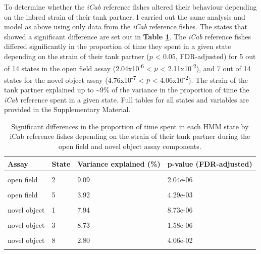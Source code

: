 \documentclass[
]{book}
\begin{document}
To determine whether the \emph{iCab} reference fishes altered their behaviour depending on the inbred strain of their tank partner, I carried out the same analysis and model as above using only data from the \emph{iCab} reference fishes. The states that showed a significant difference are set out in \textbf{Table \ref{tab:pilot-sge-tbl}}. The \emph{iCab} reference fishes differed significantly in the proportion of time they spent in a given state depending on the strain of their tank partner (\(p\) \textless{} 0.05, FDR-adjusted) for 5 out of 14 states in the open field assay (2.04x10\textsuperscript{-6} \textless{} \(p\) \textless{} 2.11x10\textsuperscript{-2}), and 7 out of 14 states for the novel object assay (4.76x10\textsuperscript{-7} \textless{} \(p\) \textless{} 4.06x10\textsuperscript{-2}). The strain of the tank partner explained up to \textasciitilde9\% of the variance in the proportion of time the \emph{iCab} reference spent in a given state. Full tables for all states and variables are provided in the Supplementary Material.

\begin{table}

\caption{\label{tab:pilot-sge-tbl}Significant differences in the proportion of time spent in each HMM state by iCab reference fishes depending on the strain of their tank partner during the open field and novel object assay components.}
\centering
\begin{tabular}[t]{llll}
\toprule
Assay & State & Variance explained (\%) & p-value (FDR-adjusted)\\
\midrule
\cellcolor{gray!6}{open field} & \cellcolor{gray!6}{1} & \cellcolor{gray!6}{8.52} & \cellcolor{gray!6}{5.88e-06}\\
open field & 2 & 9.09 & 2.04e-06\\
\cellcolor{gray!6}{open field} & \cellcolor{gray!6}{3} & \cellcolor{gray!6}{7.97} & \cellcolor{gray!6}{1.77e-05}\\
open field & 5 & 3.92 & 4.29e-03\\
\cellcolor{gray!6}{open field} & \cellcolor{gray!6}{12} & \cellcolor{gray!6}{2.97} & \cellcolor{gray!6}{2.11e-02}\\
\addlinespace
novel object & 1 & 7.94 & 8.73e-06\\
\cellcolor{gray!6}{novel object} & \cellcolor{gray!6}{2} & \cellcolor{gray!6}{9.38} & \cellcolor{gray!6}{4.76e-07}\\
novel object & 3 & 8.73 & 1.58e-06\\
\cellcolor{gray!6}{novel object} & \cellcolor{gray!6}{6} & \cellcolor{gray!6}{4.76} & \cellcolor{gray!6}{1.23e-03}\\
novel object & 8 & 2.80 & 4.06e-02\\
\addlinespace
\cellcolor{gray!6}{novel object} & \cellcolor{gray!6}{10} & \cellcolor{gray!6}{3.81} & \cellcolor{gray!6}{8.43e-03}\\
\bottomrule
\end{tabular}
\end{table}
\end{document}
